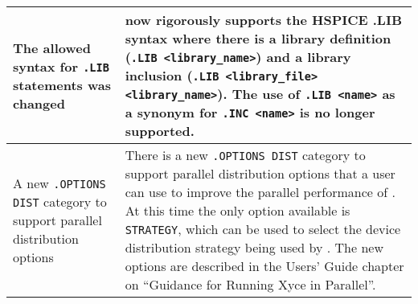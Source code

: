 {\begin{longtable}[h] {>{\raggedright\small}m{2in}|>{\raggedright\let\\\tabularnewline\small}m{3.5in}}
The allowed syntax for \texttt{.LIB} statements was changed & \Xyce{} 
now rigorously supports the HSPICE .LIB syntax where there is a 
library definition (\texttt{.LIB <library\_name>}) and a 
library inclusion (\texttt{.LIB <library\_file> <library\_name>}).
The use of \texttt{.LIB <name>} as a synonym for
\texttt{.INC <name>} is no longer supported.\\ \hline

A new \texttt{.OPTIONS DIST} category to support parallel distribution options &
There is a new \texttt{.OPTIONS DIST} category to support parallel
distribution options that a user can use to improve the parallel
performance of \Xyce{}.  At this time the only option available is
\texttt{STRATEGY}, which can be used to select the device distribution
strategy being used by \Xyce{}.  The new options are described in the
Users' Guide chapter on ``Guidance for Running Xyce in Parallel''.

\end{longtable}
}
